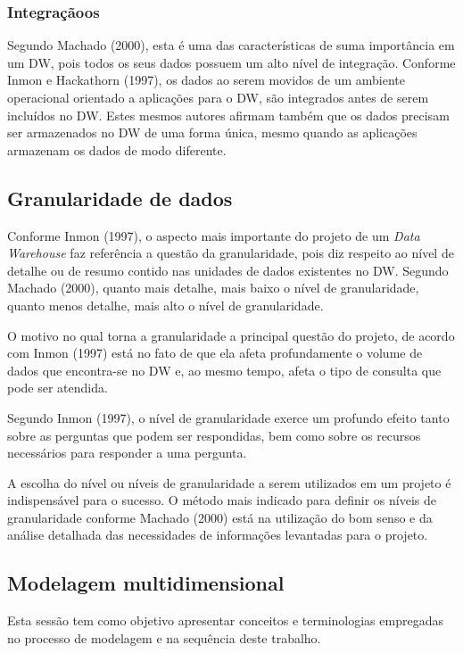 \subsubsection{Integraçãoos}

Segundo Machado (2000), esta é uma das características de suma importância em um DW, pois todos os seus dados possuem um alto nível de integração.
Conforme Inmon e Hackathorn (1997), os dados ao serem movidos de um ambiente operacional orientado a aplicações para o DW, são integrados antes de serem incluídos no DW. Estes mesmos autores afirmam também que os dados precisam ser armazenados no DW de uma forma única, mesmo quando as aplicações armazenam os dados de modo diferente.

\subsection{Granularidade de dados}

Conforme Inmon (1997), o aspecto mais importante do projeto de um \textit{Data Warehouse} faz referência a questão da granularidade, pois diz respeito ao nível de detalhe ou de resumo contido nas unidades de dados existentes no DW. Segundo Machado (2000), quanto mais detalhe, mais baixo o nível de granularidade, quanto menos detalhe, mais alto o nível de granularidade.

O motivo no qual torna a granularidade a principal questão do projeto, de acordo com Inmon (1997) está no fato de que ela afeta profundamente o volume de dados que encontra-se no DW e, ao mesmo tempo, afeta o tipo de consulta que pode ser atendida.

Segundo Inmon (1997), o nível de granularidade exerce um profundo efeito tanto sobre as perguntas que podem ser respondidas, bem como sobre os recursos necessários para responder a uma pergunta.

A escolha do nível ou níveis de granularidade a serem utilizados em um projeto é indispensável para o sucesso. O método mais indicado para definir os níveis de granularidade conforme Machado (2000) está na utilização do bom senso e da análise detalhada das necessidades de informações levantadas para o projeto.
	
\subsection{Modelagem multidimensional}

Esta sessão tem como objetivo apresentar conceitos e terminologias empregadas no processo de modelagem e na sequência deste trabalho. 

